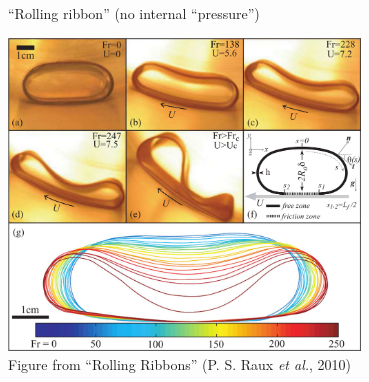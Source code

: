 \documentclass{beamer}
\begin{document}
	\begin{frame}{``Rolling ribbon'' (no internal ``pressure'')}
		\begin{center}
			\includegraphics[width=0.7\textwidth]{res/rolling-ribbon.png}\\
			\footnotesize Figure from ``Rolling Ribbons'' (P. S. Raux \textit{et al.}, 2010)
		\end{center}
	\end{frame}
\end{document}
